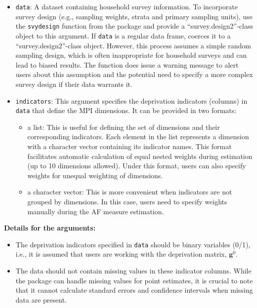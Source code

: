 \begin{itemize}
\item
  \texttt{data}: A dataset containing household survey information. To incorporate survey design (e.g., sampling weights, strata and primary sampling units), use the \texttt{svydesign} function from the  package and provide a ``survey.design2''-class object to this argument. If \texttt{data} is a regular data frame,  coerces it to a ``survey.design2''-class object. However, this process assumes a simple random sampling design, which is often inappropriate for household surveys and can lead to biased results. The function does issue a warning message to alert users about this assumption and the potential need to specify a more complex survey design if their data warrants it.
\item
  \texttt{indicators}: This argument specifies the deprivation indicators (columns) in \texttt{data} that define the MPI dimensions. It can be provided in two formats:

  \begin{itemize}
  \item
    a list: This is useful for defining the set of dimensions and their corresponding indicators. Each element in the list represents a dimension with a character vector containing its indicator names. This format facilitates automatic calculation of equal nested weights during estimation (up to 10 dimensions allowed). Under this format, users can also specify weights for unequal weighting of dimensions.
  \item
    a character vector: This is more convenient when indicators are not grouped by dimensions. In this case, users need to specify weights manually during the AF measure estimation.
  \end{itemize}
\end{itemize}

\textbf{Details for the arguments:}

\begin{itemize}
\item
  The deprivation indicators specified in \texttt{data} should be binary variables (0/1), i.e., it is assumed that users are working with the deprivation matrix, \(\mathbf{g}^0\).
\item
  The data should not contain missing values in these indicator columns. While the  package can handle missing values for point estimates, it is crucial to note that it cannot calculate standard errors and confidence intervals when missing data are present.
\end{itemize}

